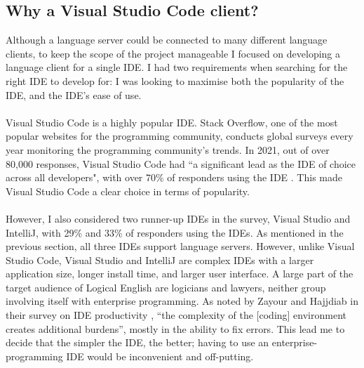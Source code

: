 \documentclass[../main.tex]{subfiles}
\begin{document}
\subsection{Why a Visual Studio Code client?}
Although a language server could be connected to many different language clients, to keep the scope of the project manageable I focused on developing a language client for a single IDE. I had two requirements when searching for the right IDE to develop for: I was looking to maximise both the popularity of the IDE, and the IDE's ease of use.
\\
\\
Visual Studio Code is a highly popular IDE. Stack Overflow, one of the most popular websites for the programming community, conducts global surveys every year monitoring the programming community's trends. In 2021, out of over 80,000 responses, Visual Studio Code had ``a significant lead as the IDE of choice across all developers", with over 70\% of responders using the IDE  \cite{ide_rankings}. This made Visual Studio Code a clear choice in terms of popularity. 
\\
\\
However, I also considered two runner-up IDEs in the survey, Visual Studio and IntelliJ, with 29\% and 33\% of responders using the IDEs. As mentioned in the previous section, all three IDEs support language servers. However, unlike Visual Studio Code, Visual Studio and IntelliJ are complex IDEs with a larger application size, longer install time, and larger user interface. A large part of the target audience of Logical English are logicians and lawyers, neither group involving itself with enterprise programming. As noted by Zayour and Hajjdiab in their survey on IDE productivity \cite{ide_productivity}, ``the complexity of the [coding] environment creates additional burdens'', mostly in the ability to fix errors. This lead me to decide that the simpler the IDE, the better; having to use an enterprise-programming IDE would be inconvenient and off-putting. 

\end{document}

